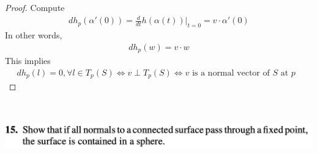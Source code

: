 \documentclass{report}
\begin{document}
\begin{proof}
Compute 
\begin{align*}
dh_p(\alpha '(0))=\frac{d}{dt}h(\alpha (t))|_{t=0}=v\cdot \alpha '(0)
\end{align*}
In other words, 
\begin{align*}
dh_p(w)=v\cdot w
\end{align*}
This implies 
\begin{align*}
dh_p(l)=0,\forall l\in T_p(S)\iff v\perp T_p(S)\iff  v\text{ is a normal vector of $S$ at $p$ }
\end{align*}
\end{proof}





\begin{question}{}{}
\includegraphics[height=3cm,width=18cm]{hw4q5}
\end{question}
\end{document}
